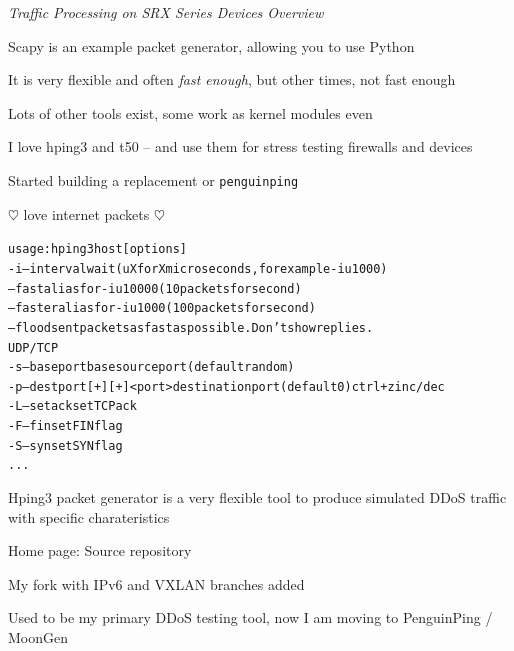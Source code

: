 \documentclass[Screen16to9,17pt]{foils}
\begin{document}


\emph{Traffic Processing on SRX Series Devices Overview}\\ {\scriptsize
{}}




\begin{list2}
\item Scapy is an example packet generator, allowing you to use Python
\item It is very flexible and often \emph{fast enough}, but other times, not fast enough
\item Lots of other tools exist, some work as kernel modules even
\item I love hping3 and t50 -- and use them for stress testing firewalls and devices
\item Started building a replacement or \verb+penguinping+
\end{list2}
\centerline{\Large $\heartsuit$ love internet packets $\heartsuit$}


\begin{alltt}\footnotesize
usage: hping3 host [options]
  -i  --interval  wait (uX for X microseconds, for example -i u1000)
      --fast      alias for -i u10000 (10 packets for second)
      --faster    alias for -i u1000 (100 packets for second)
      --flood      sent packets as fast as possible. Don't show replies.
UDP/TCP
  -s  --baseport   base source port             (default random)
  -p  --destport   [+][+]<port> destination port(default 0) ctrl+z inc/dec
  -L  --setack     set TCP ack
  -F  --fin        set FIN flag
  -S  --syn        set SYN flag
...
\end{alltt}

\begin{list2}
\item Hping3 packet generator is a very flexible tool to produce simulated DDoS traffic with specific charateristics
\item Home page:  Source repository 
\item My fork with IPv6 and VXLAN branches added 
\item Used to be my primary DDoS testing tool, now I am moving to PenguinPing / MoonGen
\end{list2}
\end{document}
